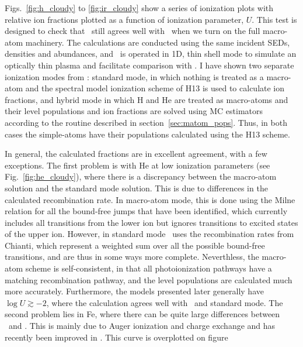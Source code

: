 Figs.~\ref{fig:h_cloudy} to \ref{fig:ir_cloudy} show a series of 
ionization plots with relative ion fractions plotted as a function of
ionization parameter, $U$. This test is designed to check that \py\ still agrees
well with \cld\ when we turn on the full macro-atom machinery.
The calculations are conducted using the same 
incident SEDs, densities and abundances, and \py\ is operated in
1D, thin shell mode to simulate an optically thin plasma and facilitate
comparison with \cld. I have shown two separate ionization modes
from \py: standard mode, in which nothing is treated as a macro-atom
and the spectral model ionization scheme of H13 is used to calculate
ion fractions, and hybrid mode in which H and He are treated as 
macro-atoms and their level populations and ion fractions are solved
using MC estimators according to the routine
described in section~\ref{sec:matom_pops}. Thus, in both 
cases the simple-atoms have their populations calculated using the H13 scheme.

In general, the calculated fractions are in excellent agreement, with a few 
exceptions. The first problem is with He at low ionization parameters 
(see Fig.~\ref{fig:he_cloudy}), where there is a discrepancy between 
the macro-atom solution and the standard mode solution. This is due to 
differences in the calculated recombination rate. In macro-atom mode, 
this is done using the Milne relation for all the bound-free jumps that 
have been identified, which currently includes all transitions from the lower ion but
ignores transitions to excited states of the upper ion. However, 
in standard mode \py\ uses the recombination rates from Chianti,
which represent a weighted sum over all the possible bound-free transitions,
and are thus in some ways more complete. Neverthless, the macro-atom
scheme is self-consistent, in that all photoionization pathways have a matching 
recombination pathway, and the level populations are calculated much more
accurately. Furthermore, the models presented later generally have 
$\log U \gtrsim -2$, where the calculation
agrees well with \cld\ and standard mode.
The second problem lies in Fe, where there can be quite large differences
between \py\ and \cld. This is mainly due to Auger ionization and charge 
exchange and has recently been improved in \py. This curve is overplotted 
on figure~


